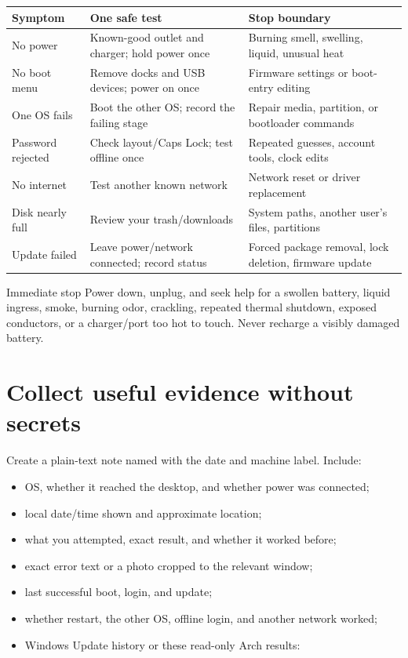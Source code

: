 \begin{tabularx}{\linewidth}{@{}p{.24\linewidth}p{.35\linewidth}L@{}}
\toprule
\textbf{Symptom} & \textbf{One safe test} & \textbf{Stop boundary}\\
\midrule
No power & Known-good outlet and charger; hold power once & Burning smell,
swelling, liquid, unusual heat\\
No boot menu & Remove docks and USB devices; power on once & Firmware settings
or boot-entry editing\\
One OS fails & Boot the other OS; record the failing stage & Repair media,
partition, or bootloader commands\\
Password rejected & Check layout/Caps Lock; test offline once & Repeated
guesses, account tools, clock edits\\
No internet & Test another known network & Network reset or driver replacement\\
Disk nearly full & Review your trash/downloads & System paths, another user's
files, partitions\\
Update failed & Leave power/network connected; record status & Forced package
removal, lock deletion, firmware update\\
\bottomrule
\end{tabularx}

\begin{gate}{Immediate stop}
Power down, unplug, and seek help for a swollen battery, liquid ingress, smoke,
burning odor, crackling, repeated thermal shutdown, exposed conductors, or a
charger/port too hot to touch. Never recharge a visibly damaged battery.
\end{gate}

\section{Collect useful evidence without secrets}
\label{sec:evidence}

Create a plain-text note named with the date and machine label. Include:

\begin{itemize}
\item OS, whether it reached the desktop, and whether power was connected;
\item local date/time shown and approximate location;
\item what you attempted, exact result, and whether it worked before;
\item exact error text or a photo cropped to the relevant window;
\item last successful boot, login, and update;
\item whether restart, the other OS, offline login, and another network worked;
\item Windows Update history or these read-only Arch results:
\end{itemize}

